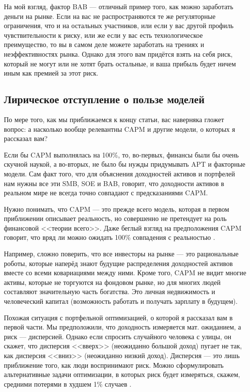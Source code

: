 На мой взгляд, фактор BAB --- отличный пример того, как можно заработать деньги 
на рынке. Если на вас не распространяются те же регуляторные ограничения, что и
на остальных участников, или если у вас другой профиль чувствительности к
риску, или же если у вас есть технологическое преимущество, то вы в самом деле 
можете заработать на трениях и неэффективностях рынка. Однако для этого вам
придётся взять на себя риск, который не могут или не хотят брать остальные, и 
ваша прибыль будет ничем иным как премией за этот риск.

\subsection{Лирическое отступление о пользе моделей}

По мере того, как мы приближаемся к концу статьи, вас наверняка гложет вопрос: 
а насколько вообще релевантны CAPM и другие модели, о которых я рассказал вам?

Если бы CAPM выполнялась на 100\%, то, во-первых, финансы были бы очень скучной
наукой, а во-вторых, не было бы нужды придумывать APT и факторные модели. Сам 
факт того, что для объяснения доходностей активов и портфелей нам нужны все эти 
SMB, SOE и BAB, говорит, что доходности активов в реальном мире не всегда точно 
совпадают с предсказаниями CAPM.

Нужно понимать, что CAPM --- это прежде всего модель, которая в первом 
приближении описывает реальность, но совершенно не претендует на роль 
финансовой <<теории всего>>. Даже беглый взгляд на предположения CAPM говорит, 
что вряд ли можно ожидать 100\% совпадения с реальностью
\cite[ch.~14.2]{welch}.

Например, сложно поверить, что все инвесторы на рынке --- это рациональные роботы, которые 
наперёд знают будущие распределения доходностей активов вместе со всеми 
ковариациями между ними. Кроме того, CAPM не видит многие активы, которые
не торгуются на фондовом рынке, но для многих людей составляют значительную 
часть богатства. Это личная недвижимость и человеческий капитал (возможность 
работать и получать зарплату в будущем).

Похожая ситуация с портфельной оптимизацией, о которой я рассказал вам в первой 
части. Мы предположили, что доходность измеряется мат. ожиданием, а риск --- 
дисперсией. Однако если спросить случайного человека с улицы, он скажет, что 
дисперсия <<вверх>> (неожиданно большой доход) пугает не так, как дисперсия 
<<вниз>> (неожиданно низкий доход). Дисперсия --- это лишь приближение того, 
как люди воспринимают риск. Можно сформулировать альтернативные задачи 
оптимизации, в которых риск будет измеряться, скажем, средними потерями в 
худшем 1\% случаев \cite{krokhmal2002portfolio}.


